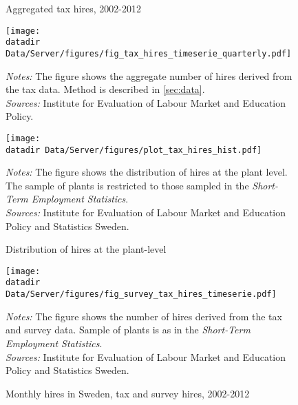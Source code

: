 \begin{figure}[t]
\centering
\caption{Aggregated tax hires, 2002-2012}
\label{fig:hires_tax_timeserie}
\texttt{[image: \\datadir Data/Server/figures/fig\_tax\_hires\_timeserie\_quarterly.pdf]}
\begin{flushleft}
\footnotesize{\emph{Notes:} The figure shows the aggregate number of hires derived from the tax data. Method is described in \ref{sec:data}.} \\
\footnotesize{\emph{Sources:} Institute for Evaluation of Labour Market and Education Policy.}
\end{flushleft}

\vspace{5mm}
\centering
\caption{Distribution of hires at the plant-level}
\label{fig:hires_tax_hist}
\texttt{[image: \\datadir Data/Server/figures/plot\_tax\_hires\_hist.pdf]}
\begin{flushleft}
\footnotesize{\emph{Notes:} The figure shows the distribution of hires at the plant level. The sample of plants is restricted to those sampled in the \emph{Short-Term Employment Statistics}.} \\
\footnotesize{\emph{Sources:} Institute for Evaluation of Labour Market and Education Policy and Statistics Sweden.}
\end{flushleft}
\end{figure}

\begin{figure}[t]
\centering
\caption{Monthly hires in Sweden, tax and survey hires, 2002-2012}
\label{fig:hires_tax_survey_timeserie}
\texttt{[image: \\datadir Data/Server/figures/fig\_survey\_tax\_hires\_timeserie.pdf]}
\begin{flushleft}
\footnotesize{\emph{Notes:} The figure shows the number of hires derived from the tax and survey data. Sample of plants is as in the \emph{Short-Term Employment Statistics}.} \\
\footnotesize{\emph{Sources:} Institute for Evaluation of Labour Market and Education Policy and Statistics Sweden.}
\end{flushleft}
\end{figure}




